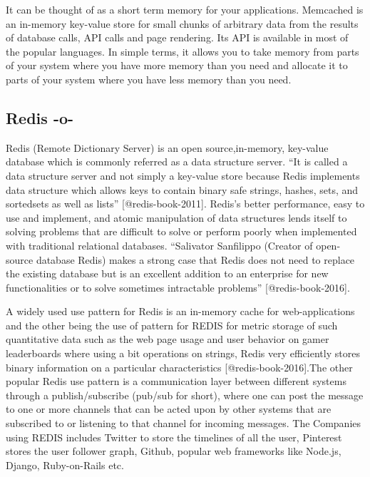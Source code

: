 It can be thought of as a short term memory for your applications.
Memcached is an in-memory key-value store for small chunks of
arbitrary data from the results of database calls, API calls and page
rendering. Its API is available in most of the popular languages. In
simple terms, it allows you to take memory from parts of your system
where you have more memory than you need and allocate it to parts of
your system where you have less memory than you need.


     
\subsection{Redis -o-}

Redis (Remote Dictionary Server) is an open source,in-memory,
key-value database which is commonly referred as a data structure
server. ``It is called a data structure server and not simply a
key-value store because Redis implements data structure which allows
keys to contain binary safe strings, hashes, sets, and sortedsets as
well as lists'' [@redis-book-2011].  Redis's better performance,
easy to use and implement, and atomic manipulation of data structures
lends itself to solving problems that are difficult to solve or
perform poorly when implemented with traditional relational
databases. ``Salivator Sanfilippo (Creator of open-source database
Redis) makes a strong case that Redis does not need to replace the
existing database but is an excellent addition to an enterprise for
new functionalities or to solve sometimes intractable problems''
[@redis-book-2016].

A widely used use pattern for Redis is an in-memory cache for
web-applications and the other being the use of pattern for REDIS for
metric storage of such quantitative data such as the web page usage
and user behavior on gamer leaderboards where using a bit operations
on strings, Redis very efficiently stores binary information on a
particular characteristics [@redis-book-2016].The other popular
Redis use pattern is a communication layer between different systems
through a publish/subscribe (pub/sub for short), where one can post
the message to one or more channels that can be acted upon by other
systems that are subscribed to or listening to that channel for
incoming messages. The Companies using REDIS includes Twitter to store
the timelines of all the user, Pinterest stores the user follower
graph, Github, popular web frameworks like Node.js, Django,
Ruby-on-Rails etc.



